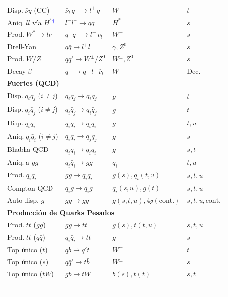 {\begin{tabular}{@{}llll@{}}
Disp. $\bar{\nu}q$ (CC)    & $\bar{\nu}_l\, q^+ \to l^+\, q^-$  & $W^-$                & $t$ \\
Aniq. $l\bar{l}$ vía $H^*$$\color{blue}^\dagger\color{black}$ & $l^+ l^- \to q \bar{q}$   & $H^*$                & $s$ \\
Prod. $W^*\!\to l\nu$      & $q^+\bar{q}^- \to l^+\, \nu_l$     & $W^+$                & $s$ \\
Drell-Yan                  & $q \bar{q} \to l^+ l^-$             & $\gamma, Z^0$        & $s$ \\
Prod. $W/Z$                & $q \bar{q}' \to W^\pm / Z^0$        & $W^\pm, Z^0$         & $s$ \\
Decay $\beta$              & $q^- \to q^+\, l^-\, \bar{\nu}_l$  & $W^-$                & Dec. \\
\midrule
\multicolumn{4}{l}{\textbf{Fuertes (QCD)}} \\
Disp. $q_i q_j$ ($i \neq j$) & $q_i q_j \to q_i q_j$ & $g$ & $t$ \\
Disp. $q_i \bar{q}_j$ ($i \neq j$) & $q_i \bar{q}_j \to q_i \bar{q}_j$ & $g$ & $t$ \\
Disp. $q_i q_i$ & $q_i q_i \to q_i q_i$ & $g$ & $t, u$ \\
Aniq. $q_i\bar{q}_i$ ($i \neq j$) & $q_i \bar{q}_i \to q_j \bar{q}_j$ & $g$ & $s$ \\
Bhabha QCD & $q_i \bar{q}_i \to q_i \bar{q}_i$ & $g$ & $s, t$ \\
Aniq. a $gg$ & $q_i \bar{q}_i \to g g$ & $q_i$ & $t, u$ \\
Prod. $q_i\bar{q}_i$ & $g g \to q_i \bar{q}_i$ & $g (s), q_i (t, u)$ & $s, t, u$ \\
Compton QCD & $q_i g \to q_i g$ & $q_i (s, u), g (t)$ & $s, t, u$ \\
Auto-disp. $g$ & $g g \to g g$ & $g (s, t, u), 4g (\text{cont.})$ & $s, t, u, \text{cont.}$ \\
\midrule
\multicolumn{4}{l}{\textbf{Producción de Quarks Pesados}} \\
Prod. $t\bar{t}$ ($gg$) & $g g \to t \bar{t}$ & $g (s), t (t, u)$ & $s, t, u$ \\
Prod. $t\bar{t}$ ($q\bar{q}$) & $q_i \bar{q}_i \to t \bar{t}$ & $g$ & $s$ \\
Top único ($t$) & $q b \to q' t$ & $W^\pm$ & $t$ \\
Top único ($s$) & $q \bar{q}' \to t \bar{b}$ & $W^\pm$ & $s$ \\
Top único ($tW$) & $g b \to t W^-$ & $b (s), t (t)$ & $s, t$ \\
$$
\end{tabular}}
